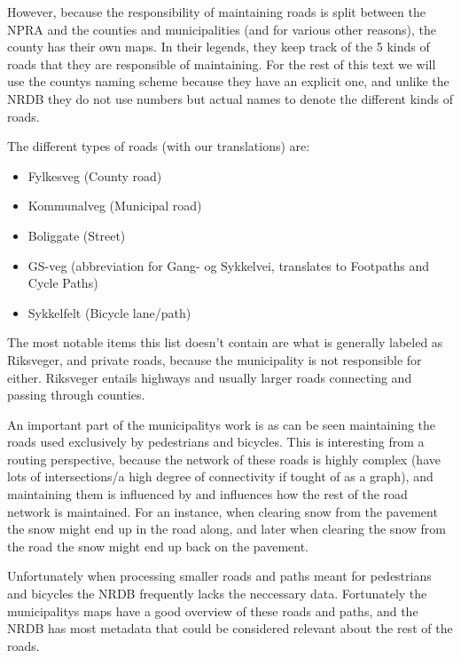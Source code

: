 However, because the responsibility of maintaining roads is split between the NPRA and the counties and municipalities (and for various other reasons), the county has their own maps. In their legends, they keep track of the 5 kinds of roads that they are responsible of maintaining. For the rest of this text we will use the countys naming scheme because they have an explicit one, and unlike the NRDB they do not use numbers but actual names to denote the different kinds of roads.

The different types of roads (with our translations) are:
\begin{itemize}
	\item Fylkesveg (County road)
	\item Kommunalveg (Municipal road)
	\item Boliggate (Street)
	\item GS-veg (abbreviation for Gang- og Sykkelvei, translates to Footpaths and Cycle Paths) %
	\item Sykkelfelt (Bicycle lane/path)
\end{itemize}

The most notable items this list doesn't contain are what is generally labeled as Riks\-veger, and private roads, because the municipality is not responsible for either. Riks\-veger entails highways and usually larger roads connecting and passing through counties.

An important part of the municipalitys work is as can be seen maintaining the roads used exclusively by pedestrians and bicycles. This is interesting from a routing perspective, because the network of these roads is highly complex (have lots of intersections/a high degree of connectivity if tought of as a graph), and maintaining them is influenced by and influences how the rest of the road network is maintained. For an instance, when clearing snow from the pavement the snow might end up in the road along, and later when clearing the snow from the road the snow might end up back on the pavement.

Unfortunately when processing smaller roads and paths meant for pedestrians and bicycles the NRDB frequently lacks the neccessary data. Fortunately the municipalitys maps have a good overview of these roads and paths, and the NRDB has most metadata that could be considered relevant about the rest of the roads.

